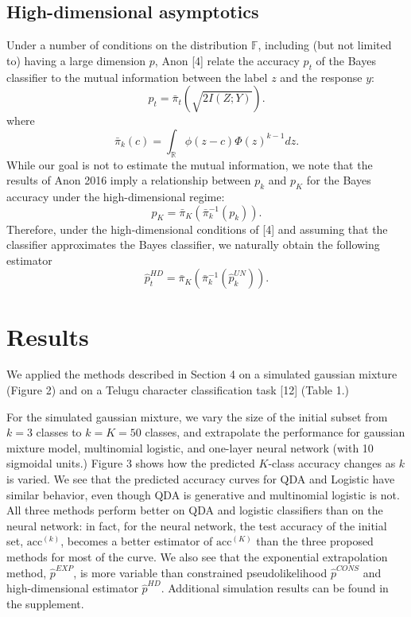 \documentclass[12pt]{article}
\begin{document}
\subsection{High-dimensional asymptotics}

Under a number of conditions on the distribution $\mathbb{F}$, including (but not limited to) having a large dimension $p$,
Anon [4] relate the accuracy $p_t$ of the Bayes classifier to the mutual information between the label $z$ and
the response $y$:
\[
p_t = \bar{\pi}_t(\sqrt{2I(Z; Y)}).
\]
where
\[
\bar{\pi}_k(c) = \int_{\mathbb{R}} \phi(z - c)  \Phi(z)^{k-1} dz.
\]
While our goal is not to estimate the mutual information, we note that the results of Anon 2016
imply a relationship between $p_k$ and $p_K$ for the Bayes accuracy under the high-dimensional regime:
\[
p_K = \bar{\pi}_K\left(\bar{\pi}_k^{-1}(p_k)\right).
\]
Therefore, under the high-dimensional conditions of [4] and assuming that the classifier approximates
the Bayes classifier, we naturally obtain the following estimator
\[
\hat{p}_t^{HD} = \bar{\pi}_K\left(\bar{\pi}_k^{-1}(\hat{p}_k^{UN})\right).
\]

\section{Results}

We applied the methods described in Section 4 on a simulated gaussian mixture (Figure 2)
and on a Telugu character classification task [12] (Table 1.)

For the simulated gaussian mixture, we vary the size of the initial subset from $k=3$ classes to $k=K=50$ classes,
and extrapolate the performance for gaussian mixture model, multinomial logistic, and one-layer neural network (with 10 sigmoidal units.)
Figure 3 shows how the predicted $K$-class accuracy changes as $k$ is varied.
We see that the predicted accuracy curves for QDA and Logistic have similar behavior,
even though QDA is generative and multinomial logistic is not.  All three methods perform better on QDA and logistic classifiers
than on the neural network: in fact, for the neural network, the test accuracy of the initial set, $\text{acc}^{(k)}$,
becomes a better estimator of $\text{acc}^{(K)}$ than the three proposed methods for most of the curve.
We also see that the exponential extrapolation method, $\hat{p}^{EXP}$,
is more variable than constrained pseudolikelihood $\hat{p}^{CONS}$ and high-dimensional estimator $\hat{p}^{HD}$.
Additional simulation results can be found in the supplement.
\end{document}
